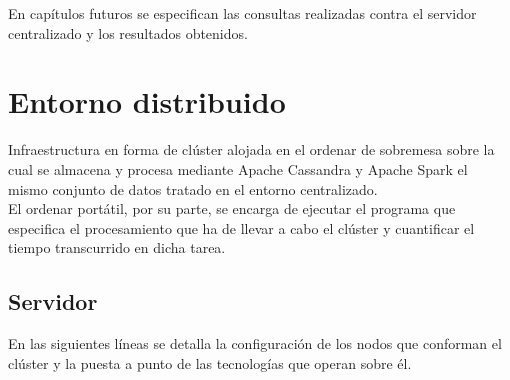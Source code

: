 En capítulos futuros se especifican las consultas realizadas contra el servidor centralizado y los resultados obtenidos.\\

\section{Entorno distribuido}

Infraestructura en forma de clúster alojada en el ordenar de sobremesa sobre la cual se almacena y procesa mediante Apache Cassandra y Apache Spark el mismo conjunto de datos tratado en el entorno centralizado.\\ 

El ordenar portátil, por su parte, se encarga de ejecutar el programa que especifica el procesamiento que ha de llevar a cabo el clúster y cuantificar el tiempo transcurrido en dicha tarea.\\

\subsection{Servidor}

En las siguientes líneas se detalla la configuración de los nodos que conforman el clúster y la puesta a punto de las tecnologías que operan sobre él.\\

